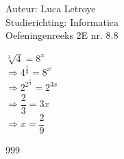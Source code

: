 \documentclass[a4paper]{article}
\begin{document}
  
\noindent \large Auteur: Luca Letroye        \\
\noindent \large Studierichting: Informatica \\
\noindent \large Oefeningenreeks 2E nr. 8.8 \\

\medskip

\normalsize

$\sqrt[3]{4} = 8^x$\\

$\Rightarrow 4^{\tfrac{1}{3}} = 8^x$\\

$\Rightarrow 2^{2^{\tfrac{1}{3}}} = 2^{3x}$\\

$\Rightarrow \dfrac{2}{3} = 3x$\\

$\Rightarrow x = \dfrac{2}{9}$\\

\begin{thebibliography}{999}
\end{thebibliography}
\end{document}
